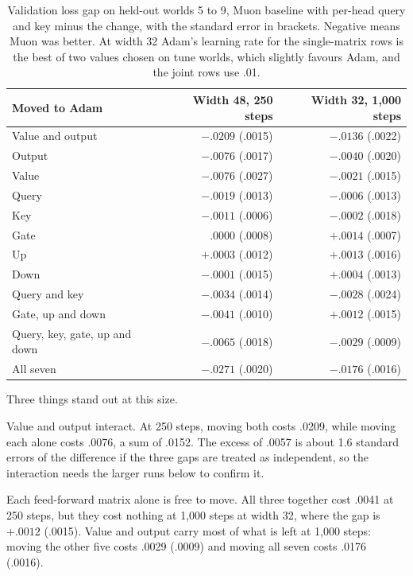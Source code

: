 \documentclass[11pt]{article}
\begin{document}
\begin{table}[t]
\centering
\begin{tabular}{lrr}
\toprule
Moved to Adam & Width 48, 250 steps & Width 32, 1,000 steps \\
\midrule
Value and output & $-.0209$ (.0015) & $-.0136$ (.0022) \\
Output & $-.0076$ (.0017) & $-.0040$ (.0020) \\
Value & $-.0076$ (.0027) & $-.0021$ (.0015) \\
Query & $-.0019$ (.0013) & $-.0006$ (.0013) \\
Key & $-.0011$ (.0006) & $-.0002$ (.0018) \\
Gate & $.0000$ (.0008) & $+.0014$ (.0007) \\
Up & $+.0003$ (.0012) & $+.0013$ (.0016) \\
Down & $-.0001$ (.0015) & $+.0004$ (.0013) \\
Query and key & $-.0034$ (.0014) & $-.0028$ (.0024) \\
Gate, up and down & $-.0041$ (.0010) & $+.0012$ (.0015) \\
Query, key, gate, up and down & $-.0065$ (.0018) & $-.0029$ (.0009) \\
All seven & $-.0271$ (.0020) & $-.0176$ (.0016) \\
\bottomrule
\end{tabular}
\caption{Validation loss gap on held-out worlds 5 to 9, Muon baseline with per-head query and key minus the change, with the standard error in brackets. Negative means Muon was better. At width 32 Adam's learning rate for the single-matrix rows is the best of two values chosen on tune worlds, which slightly favours Adam, and the joint rows use .01.}
\label{tab:small}
\end{table}

Three things stand out at this size.

Value and output interact. At 250 steps, moving both costs .0209, while moving each alone costs .0076, a sum of .0152. The excess of .0057 is about 1.6 standard errors of the difference if the three gaps are treated as independent, so the interaction needs the larger runs below to confirm it.

Each feed-forward matrix alone is free to move. All three together cost .0041 at 250 steps, but they cost nothing at 1,000 steps at width 32, where the gap is $+.0012$ (.0015). Value and output carry most of what is left at 1,000 steps: moving the other five costs .0029 (.0009) and moving all seven costs .0176 (.0016).
\end{document}
